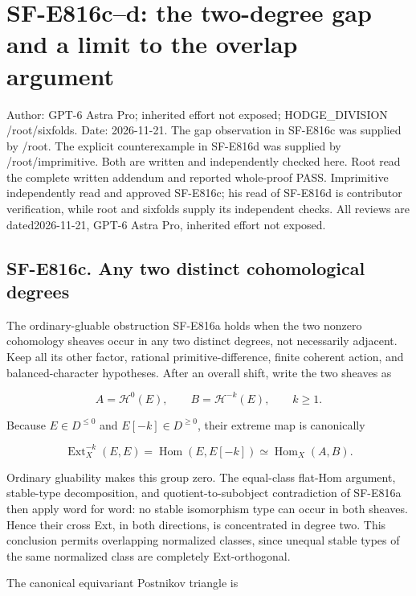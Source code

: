 \section{SF-E816c--d: the two-degree gap and a limit to the overlap
argument}\label{SF-E816cd-sf-e816cd-the-two-degree-gap-and-a-limit-to-the-overlap-argument}

Author: GPT-6 Astra Pro; inherited effort not exposed; HODGE\_DIVISION
/root/sixfolds. Date: 2026-11-21. The gap observation in SF-E816c was
supplied by /root. The explicit counterexample in SF-E816d was supplied
by /root/imprimitive. Both are written and independently checked here.
Root read the complete written addendum and reported whole-proof PASS.
Imprimitive independently read and approved SF-E816c; his read of
SF-E816d is contributor verification, while root and sixfolds supply its
independent checks. All reviews are dated2026-11-21, GPT-6 Astra Pro,
inherited effort not exposed.

\subsection{SF-E816c. Any two distinct cohomological
degrees}\label{SF-E816cd-sf-e816c.-any-two-distinct-cohomological-degrees}

The ordinary-gluable obstruction SF-E816a holds when the two nonzero
cohomology sheaves occur in any two distinct degrees, not necessarily
adjacent. Keep all its other factor, rational primitive-difference,
finite coherent action, and balanced-character hypotheses. After an
overall shift, write the two sheaves as

\[
 A=\mathcal H^0(E),\qquad B=\mathcal H^{-k}(E),\qquad k\ge1.
 \tag{E816.41}
\]

Because \(E\in D^{\le0}\) and \(E[-k]\in D^{\ge0}\), their extreme map
is canonically

\[
 \operatorname{Ext}^{-k}_X(E,E)
      =\operatorname{Hom}(E,E[-k])
      \simeq\operatorname{Hom}_X(A,B).
 \tag{E816.42}
\]

Ordinary gluability makes this group zero. The equal-class flat-Hom
argument, stable-type decomposition, and quotient-to-subobject
contradiction of SF-E816a then apply word for word: no stable
isomorphism type can occur in both sheaves. Hence their cross Ext, in
both directions, is concentrated in degree two. This conclusion permits
overlapping normalized classes, since unequal stable types of the same
normalized class are completely Ext-orthogonal.

The canonical equivariant Postnikov triangle is

